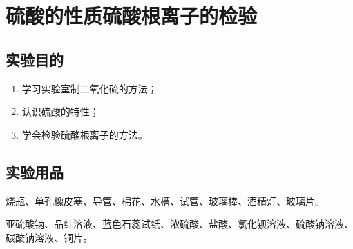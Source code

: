 \section{硫酸的性质\texorpdfstring{\quad}{ }硫酸根离子的检验}
\subsection*{实验目的}
\begin{enumerate}[1.]
  \item 学习实验室制二氧化硫的方法；
  \item 认识硫酸的特性；
  \item 学会检验硫酸根离子的方法。
\end{enumerate}

\subsection*{实验用品}
烧瓶、单孔橡皮塞、导管、棉花、水槽、试管、玻璃棒、酒精灯、玻璃片。

亚硫酸钠、品红溶液、蓝色石蕊试纸、浓硫酸、盐酸、氯化钡溶液、硫酸钠溶液、碳酸钠溶液、铜片。

